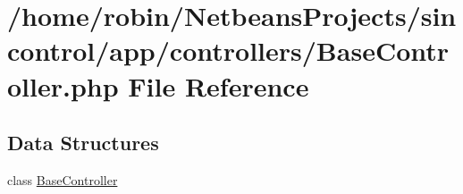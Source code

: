 \hypertarget{_base_controller_8php}{}\section{/home/robin/\+Netbeans\+Projects/sincontrol/app/controllers/\+Base\+Controller.php File Reference}
\label{_base_controller_8php}
\subsection*{Data Structures}
\begin{DoxyCompactItemize}
\item 
class \hyperlink{class_base_controller}{Base\+Controller}
\end{DoxyCompactItemize}
